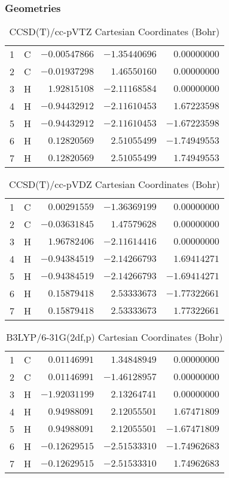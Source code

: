 \documentclass[10pt,oneside]{article}
\begin{document}
\subsubsection*{Geometries}
\begin{table}[h!]
\centering
\caption{CCSD(T)/cc-pVTZ Cartesian Coordinates (Bohr)}
\begin{tabular}{llrrr}
1  & C  & $-0.00547866$ & $-1.35440696$ & $ 0.00000000$ \\
2  & C  & $-0.01937298$ & $ 1.46550160$ & $ 0.00000000$ \\
3  & H  & $ 1.92815108$ & $-2.11168584$ & $ 0.00000000$ \\
4  & H  & $-0.94432912$ & $-2.11610453$ & $ 1.67223598$ \\
5  & H  & $-0.94432912$ & $-2.11610453$ & $-1.67223598$ \\
6  & H  & $ 0.12820569$ & $ 2.51055499$ & $-1.74949553$ \\
7  & H  & $ 0.12820569$ & $ 2.51055499$ & $ 1.74949553$ \\
\end{tabular}
\end{table}

\begin{table}[h!]
\centering
\caption{CCSD(T)/cc-pVDZ Cartesian Coordinates (Bohr)}
\begin{tabular}{llrrr}
1  & C  & $ 0.00291559$ & $-1.36369199$ & $ 0.00000000$ \\
2  & C  & $-0.03631845$ & $ 1.47579628$ & $ 0.00000000$ \\
3  & H  & $ 1.96782406$ & $-2.11614416$ & $ 0.00000000$ \\
4  & H  & $-0.94384519$ & $-2.14266793$ & $ 1.69414271$ \\
5  & H  & $-0.94384519$ & $-2.14266793$ & $-1.69414271$ \\
6  & H  & $ 0.15879418$ & $ 2.53333673$ & $-1.77322661$ \\
7  & H  & $ 0.15879418$ & $ 2.53333673$ & $ 1.77322661$ \\
\end{tabular}
\end{table}

\begin{table}[h!]
\centering
\caption{B3LYP/6-31G(2df,p) Cartesian Coordinates (Bohr)}
\begin{tabular}{llrrr}
1  & C  & $ 0.01146991$ & $ 1.34848949$ & $ 0.00000000$ \\
2  & C  & $ 0.01146991$ & $-1.46128957$ & $ 0.00000000$ \\
3  & H  & $-1.92031199$ & $ 2.13264741$ & $ 0.00000000$ \\
4  & H  & $ 0.94988091$ & $ 2.12055501$ & $ 1.67471809$ \\
5  & H  & $ 0.94988091$ & $ 2.12055501$ & $-1.67471809$ \\
6  & H  & $-0.12629515$ & $-2.51533310$ & $-1.74962683$ \\
7  & H  & $-0.12629515$ & $-2.51533310$ & $ 1.74962683$ \\
\end{tabular}
\end{table}
\end{document}
